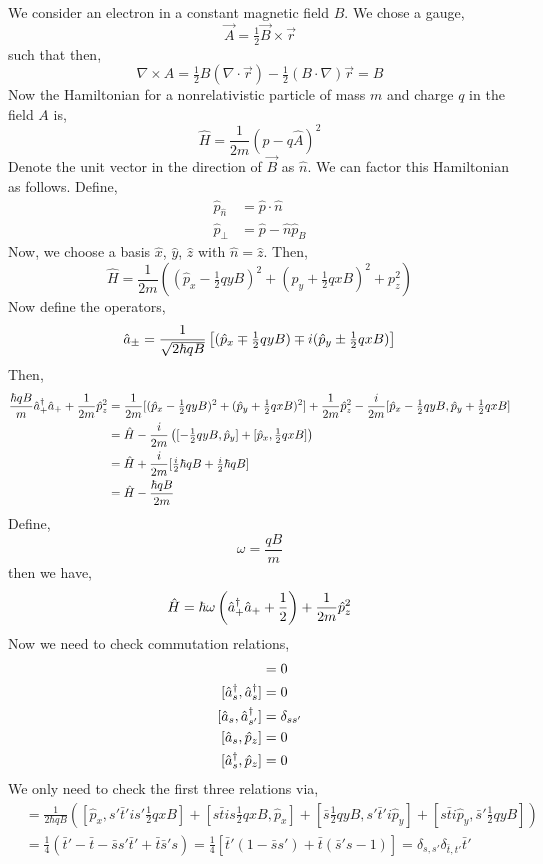 \documentclass[12pt]{extarticle}
\theoremstyle{definition}
\begin{document}
We consider an electron in a constant magnetic field $B$. We chose a gauge,
\[ \vec{A} = \tfrac{1}{2} \vec{B} \times \vec{r} \]
such that then,
\[ \nabla \times A =  \tfrac{1}{2} B (\nabla \cdot \vec{r}) - \tfrac{1}{2} (B \cdot \nabla) \vec{r} = B \]
Now the Hamiltonian for a nonrelativistic particle of mass $m$ and charge $q$ in the field $A$ is,
\[ \hat{H} = \frac{1}{2 m} (\hat{p} - q \hat{A})^2 \] 
Denote the unit vector in the direction of $\vec{B}$ as $\hat{n}$.
We can factor this Hamiltonian as follows. Define,
\begin{align*}
\hat{p}_{\hat{n}} & = \hat{p} \cdot \hat{n}
\\
\hat{p}_\perp & = \hat{p} - \hat{n} \hat{p}_B
\end{align*}
Now, we choose a basis $\hat{x}$, $\hat{y}$, $\hat{z}$ with $\hat{n} = \hat{z}$. Then,
\[ \hat{H} = \frac{1}{2m} \left( (\hat{p}_x - \tfrac{1}{2} q y B)^2 + (\hat{p}_y + \tfrac{1}{2} q x B)^2 + p_z^2 \right) \]
Now define the operators,
\[ \hat{a}_{\pm} = \frac{1}{\sqrt{2 \hbar q B}} \left[ (\hat{p}_x \mp \tfrac{1}{2} q y B) \mp i (\hat{p}_y \pm \tfrac{1}{2} q x B) \right] \]
Then,
\begin{align*}
\frac{\hbar q B}{m} \hat{a}^\dagger_{+} \hat{a}_{+} + \frac{1}{2m} \hat{p}_z^2 & = \frac{1}{2m} [(\hat{p}_x - \tfrac{1}{2} q y B)^2 + (\hat{p}_y + \tfrac{1}{2} q x B)^2] + \frac{1}{2m} \hat{p}_z^2 - \frac{i}{2m} [\hat{p}_x - \tfrac{1}{2} q y B, \hat{p}_y + \tfrac{1}{2} q x B]
\\
& = \hat{H} - \frac{i}{2m} \left( [- \tfrac{1}{2} q y B, \hat{p}_y] + [\hat{p}_x, \tfrac{1}{2} q x B] \right)  
\\
& = \hat{H} + \frac{i}{2m} [ \tfrac{i}{2} \hbar qB + \tfrac{i}{2} \hbar qB]
\\
& = \hat{H} - \frac{ \hbar qB}{2m}
\end{align*} 
Define,
\[ \omega = \frac{q B}{m}  \]
then we have,
\[ \hat{H} = \hbar \omega \left( \hat{a}^\dagger_{+} \hat{a}_{+} + \frac{1}{2} \right) + \frac{1}{2m} \hat{p}_z^2 \]
Now we need to check commutation relations,
\begin{align*} 
[\a_s, \a_{s'}] & = 0
\\
[\adag_s, \adag_s] & = 0
\\
[\a_s, \adag_{s'}] & = \delta_{s s'}
\\
[\a_s, \hat{p}_z] & = 0
\\
[\adag_s, \hat{p}_z] & = 0
\end{align*}
We only need to check the first three relations via,
\begin{align*}
[ \a_s^{t \dagger}, \a_{s'}^{t' \dagger} ] & = \frac{1}{2 \hbar q B} \left( [\hat{p}_x, s' \bar{t}' i s' \tfrac{1}{2} q x B] + [s \bar{t} i s \tfrac{1}{2} q x B, \hat{p}_x] + [\bar{s} \tfrac{1}{2} q y B, s' \bar{t}' i \hat{p}_y] + [s \bar{t} i \hat{p}_y, \bar{s}' \tfrac{1}{2} q y B]  \right)
\\
& = \tfrac{1}{4} \left( \bar{t}' - \bar{t} - \bar{s} s' \bar{t}' + \bar{t} \bar{s}' s \right) = \tfrac{1}{4} \left[ \bar{t}' (1 - \bar{s} s') + \bar{t} (\bar{s}'s - 1) \right] = \delta_{s, s'} \delta_{\bar{t}, t'} \bar{t}'
\end{align*}
\end{document}
